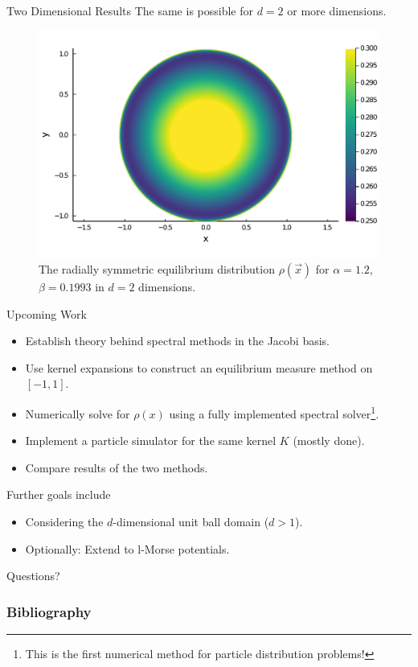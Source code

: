 \documentclass[aspectratio=169, hyperref={colorlinks=true}]{beamer}
\begin{document}
  \begin{frame}{Two Dimensional Results}
    \vspace{0.4cm}
    The same is possible for $d = 2$ or more dimensions.
    \begin{figure}[H]
      \centering
      \includegraphics[width=0.5\linewidth]{figures/spectral-solution-2d.pdf}
      \caption*{The radially symmetric equilibrium distribution $\rho(\vec{x})$ for $\alpha = 1.2$, $\beta = 0.1993$ in $d = 2$ dimensions.}
    \end{figure}
  \end{frame}

  \begin{frame}{Upcoming Work}
    \begin{itemize}
      \item Establish theory behind spectral methods in the Jacobi basis.
      \item Use kernel expansions to construct an equilibrium measure method on $[-1, 1]$.
      \item Numerically solve for $\rho(x)$ using a fully implemented spectral solver\footnote{This is the first numerical method for particle distribution problems!}.
      \item Implement a particle simulator for the same kernel $K$ (mostly done).
      \item Compare results of the two methods.
    \end{itemize}
    Further goals include
    \begin{itemize}
      \item Considering the $d$-dimensional unit ball domain ($d > 1$).
      \item Optionally: Extend to l-Morse potentials.
    \end{itemize}
  \end{frame}

  \begin{frame}{}
    Questions?
  \end{frame}

  \begin{frame}[allowframebreaks]
    \frametitle{Bibliography}
    \printbibliography[heading=bibnumbered]
  \end{frame}
\end{document}
